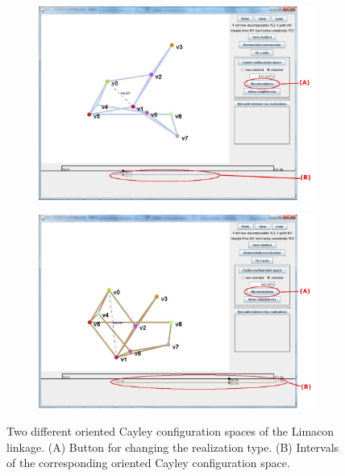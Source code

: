 \documentclass[10pt]{article}
\begin{document}
\begin{figure}[hbtp] 
\centering
\begin{subfigure}[b]{0.65\linewidth}
\centering
\includegraphics[width=1.1\textwidth]{img/occs1}
\caption{}
\end{subfigure}
%
\begin{subfigure}[b]{0.65\linewidth}
\centering
\includegraphics[width=1.1\textwidth]{img/occs2}
\caption{}
\end{subfigure}
\caption{Two different oriented Cayley configuration spaces of the Limacon linkage. 
(A) Button for changing the realization type. 
(B) Intervals of the corresponding oriented Cayley configuration space.  }
\label{fig:occs}
\end{figure}
\end{document}
